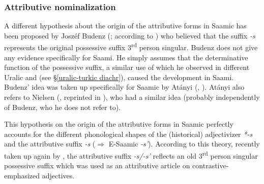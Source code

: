 {
\subsubsection{Attributive nominalization}
A different hypothesis about the origin of the attributive forms in Saamic has been proposed by Joszéf Budenz (\citeyear{budenz1870}; according to \citealt{atanyi1942,atanyi1943}) who believed that the suffix \textit{-s} represents the original possessive suffix 3\textsuperscript{rd} person singular. Budenz does not give any evidence specifically for Saami. He simply assumes that the determinative function of the possessive suffix, a similar use of which he observed in different Uralic and  (see \S\ref{uralic-turkic diachr}), caused the development in Saami. Budenz' idea was taken up specifically for Saamic by Atányi (\citeyear{atanyi1942}, \citeyear{atanyi1943}). Atányi also refers to Nielsen (\citeyear{nielsen1933}, reprinted in \citealt{nielsen1945b}), who had a similar idea (probably independently of Budenz, who he does not refer to).

This hypothesis on the origin of the attributive forms in Saamic perfectly accounts for the different phonological shapes of the (historical) adjectivizer \mbox{\textit{*-s}} and the attributive suffix \textit{-s} ($\Rightarrow$ E-Saamic \textit{-s'}). According to this theory, recently taken up again by \cite{riesler2006b}, the attributive suffix \textit{-s/-s'} reflects an old 3\textsuperscript{rd} person singular possessive suffix which was used as an attributive article on contrastive-emphasized adjectives.

}
